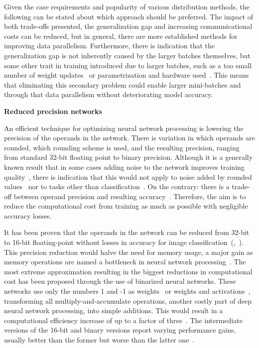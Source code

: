 Given the case requirements and popularity of various distribution methods, the following can be stated about which approach should be preferred. The impact of both trade-offs presented, the generalization gap and increasing communicational costs can be reduced, but in general, there are more established methods for improving data parallelism. Furthermore, there is indication that the generalization gap is not inherently caused by the larger batches themselves, but some other trait in training introduced due to larger batches, such as a too small number of weight updates~\cite{hofferTrainLongerGeneralize2018} or parametrization and hardware used~\cite{shallueMeasuringEffectsData2019}. This means that eliminating this secondary problem could enable larger mini-batches and through that data parallelism without deteriorating model accuracy.

\textbf{Reduced precision networks}

An efficient technique for optimizing neural network processing is lowering the precision of the operands in the network. There is variation in which operands are rounded, which rounding scheme is used, and the resulting precision, ranging from standard 32-bit floating point to binary precision. Although it is a generally known result that in some cases adding noise to the network improves training quality~\cite{murrayEnhancedMLPPerformance1994}, there is indication that this would not apply to noise added by rounded values~\cite{murrayEnhancedMLPPerformance1994} nor to tasks other than classification~\cite{anEffectsAddingNoise1996}. On the contrary: there is a trade-off between operand precision and resulting accuracy~\cite{courbariauxTrainingDeepNeural2015}. Therefore, the aim is to reduce the computational cost from training as much as possible with negligible accuracy losses.
\enlargethispage{7mm}

It has been proven that the operands in the network can be reduced from 32-bit to 16-bit floating-point without losses in accuracy for image classification~(\cite{pmlr-v37-gupta15},~\cite{micikeviciusMixedPrecisionTraining2018}). This precision reduction would halve the need for memory usage, a major gain as memory operations are named a bottleneck in neural network processing~\cite{szeEfficientProcessingDeep2017}. The most extreme approximation resulting in the biggest reductions in computational cost has been proposed through the use of binarized neural networks. These networks use only the numbers 1 and -1 as  weights~\cite{courbariauxBinaryConnectTrainingDeep2016} or weights and activations~\cite{courbariauxBinarizedNeuralNetworks2016},  transforming all multiply-and-accumulate operations, another costly part of deep neural network processing, into simple additions. This would result in a computational efficiency increase of up to a factor of three~\cite{courbariauxBinaryConnectTrainingDeep2016}. The intermediate versions of the 16-bit and binary versions report varying performance gains, usually better than the former but worse than the latter one~\cite{ben-nunDemystifyingParallelDistributed2019}.


